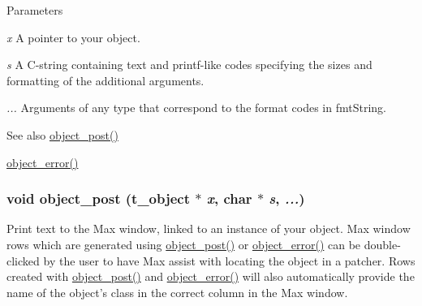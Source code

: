 \begin{DoxyParams}{Parameters}
\item[{\em x}]A pointer to your object. \item[{\em s}]A C-\/string containing text and printf-\/like codes specifying the sizes and formatting of the additional arguments. \item[{\em ...}]Arguments of any type that correspond to the format codes in fmtString.\end{DoxyParams}
\begin{DoxySeeAlso}{See also}
\hyperlink{group__console_gafb92b17363269d4d26de1823cbc2492d}{object\_\-post()} 

\hyperlink{group__console_ga05f7fed66fafc6e4d2e372b7f0fe4e43}{object\_\-error()} 
\end{DoxySeeAlso}
\hypertarget{group__console_gafb92b17363269d4d26de1823cbc2492d}{
\subsubsection[{object\_\-post}]{\setlength{\rightskip}{0pt plus 5cm}void object\_\-post ({\bf t\_\-object} $\ast$ {\em x}, \/  char $\ast$ {\em s}, \/   {\em ...})}}
\label{group__console_gafb92b17363269d4d26de1823cbc2492d}


Print text to the Max window, linked to an instance of your object. Max window rows which are generated using \hyperlink{group__console_gafb92b17363269d4d26de1823cbc2492d}{object\_\-post()} or \hyperlink{group__console_ga05f7fed66fafc6e4d2e372b7f0fe4e43}{object\_\-error()} can be double-\/clicked by the user to have Max assist with locating the object in a patcher. Rows created with \hyperlink{group__console_gafb92b17363269d4d26de1823cbc2492d}{object\_\-post()} and \hyperlink{group__console_ga05f7fed66fafc6e4d2e372b7f0fe4e43}{object\_\-error()} will also automatically provide the name of the object's class in the correct column in the Max window.


